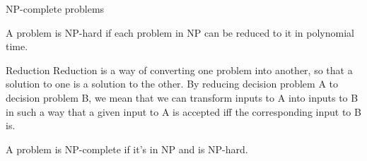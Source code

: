 \begin{frame}{NP-complete problems}
  \begin{definition}
    A problem is NP-hard if each problem in NP can be reduced to it in polynomial time.
  \end{definition}

  \begin{alertblock}{Reduction}
    Reduction is a way of converting one problem into another, so that a solution to one is a solution to the other.
    By reducing decision problem A to decision problem B, we mean that we can transform inputs to A into inputs to B in such a way that a given input to A is accepted iff the corresponding input to B is.
  \end{alertblock}

  \begin{definition}
    A problem is NP-complete if it's in NP and is NP-hard.
  \end{definition}
\end{frame}





